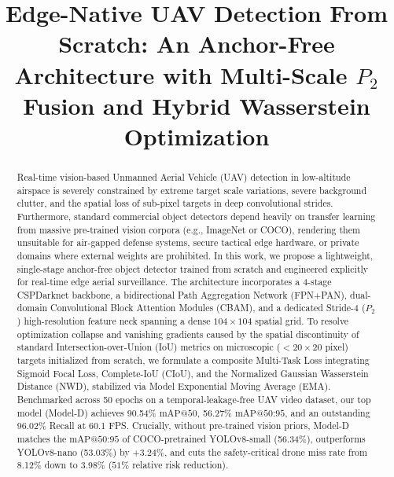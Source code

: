 \documentclass[conference]{IEEEtran}
\begin{document}
\title{Edge-Native UAV Detection From Scratch: An Anchor-Free Architecture with Multi-Scale $P_2$ Fusion and Hybrid Wasserstein Optimization}

\author{
}

\maketitle

\begin{abstract}
Real-time vision-based Unmanned Aerial Vehicle (UAV) detection in low-altitude airspace is severely constrained by extreme target scale variations, severe background clutter, and the spatial loss of sub-pixel targets in deep convolutional strides. Furthermore, standard commercial object detectors depend heavily on transfer learning from massive pre-trained vision corpora (e.g., ImageNet or COCO), rendering them unsuitable for air-gapped defense systems, secure tactical edge hardware, or private domains where external weights are prohibited. In this work, we propose a lightweight, single-stage anchor-free object detector trained from scratch and engineered explicitly for real-time edge aerial surveillance. The architecture incorporates a 4-stage CSPDarknet backbone, a bidirectional Path Aggregation Network (FPN+PAN), dual-domain Convolutional Block Attention Modules (CBAM), and a dedicated Stride-4 ($P_2$) high-resolution feature neck spanning a dense $104 \times 104$ spatial grid. To resolve optimization collapse and vanishing gradients caused by the spatial discontinuity of standard Intersection-over-Union (IoU) metrics on microscopic ($<20 \times 20$ pixel) targets initialized from scratch, we formulate a composite Multi-Task Loss integrating Sigmoid Focal Loss, Complete-IoU (CIoU), and the Normalized Gaussian Wasserstein Distance (NWD), stabilized via Model Exponential Moving Average (EMA). Benchmarked across 50 epochs on a temporal-leakage-free UAV video dataset, our top model (Model-D) achieves 90.54\% $\text{mAP@50}$, 56.27\% $\text{mAP@50:95}$, and an outstanding 96.02\% Recall at 60.1 FPS. Crucially, without pre-trained vision priors, Model-D matches the $\text{mAP@50:95}$ of COCO-pretrained YOLOv8-small (56.34\%), outperforms YOLOv8-nano (53.03\%) by +3.24\%, and cuts the safety-critical drone miss rate from 8.12\% down to 3.98\% ($51\%$ relative risk reduction).
\end{abstract}
\end{document}
